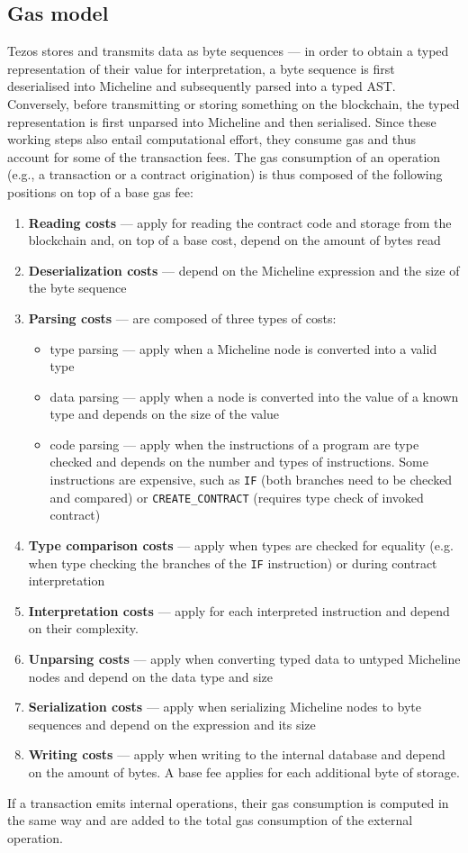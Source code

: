 \subsection{Gas model}
Tezos stores and transmits data as byte sequences --- in order to obtain a typed representation of their value for interpretation, a byte sequence is first deserialised into Micheline and subsequently parsed into a typed AST. Conversely, before transmitting or storing something on the blockchain, the typed representation is first unparsed into Micheline and then serialised. Since these working steps also entail computational effort, they consume gas and thus account for some of the transaction fees. The gas consumption of an operation (e.g., a transaction or a contract origination) is thus composed of the following positions \cite{morley_gasmodel}\cite{tezos_repo} on top of a base gas fee:
\begin{enumerate}
\item \textbf{Reading costs} --- apply for reading the contract code and storage from the blockchain and, on top of a base cost, depend on the amount of bytes read
\item \textbf{Deserialization costs} --- depend on the Micheline expression and the size of the byte sequence
\item \textbf{Parsing costs} --- are composed of three types of costs:
	\begin{itemize}
	\item type parsing --- apply when a Micheline node is converted into a valid type
	\item data parsing --- apply when a node is converted into the value of a known type and depends on the size of the value
	\item code parsing --- apply when the instructions of a program are type checked and depends on the number and types of instructions. Some instructions are expensive, such as \texttt{IF} (both branches need to be checked and compared) or \texttt{CREATE\_CONTRACT} (requires type check of invoked contract)
	\end{itemize}
\item \textbf{Type comparison costs} --- apply when types are checked for equality (e.g. when type checking the branches of the \texttt{IF} instruction) or during contract interpretation
\item \textbf{Interpretation costs} --- apply for each interpreted instruction and depend on their complexity.
\item \textbf{Unparsing costs} --- apply when converting typed data to untyped Micheline nodes and depend on the data type and size
\item \textbf{Serialization costs} --- apply when serializing Micheline nodes to byte sequences and depend on the expression and its size
\item \textbf{Writing costs} --- apply when writing to the internal database and depend on the amount of bytes. A base fee applies for each additional byte of storage.
\end{enumerate}
If a transaction emits internal operations, their gas consumption is computed in the same way and are added to the total gas consumption of the external operation.

